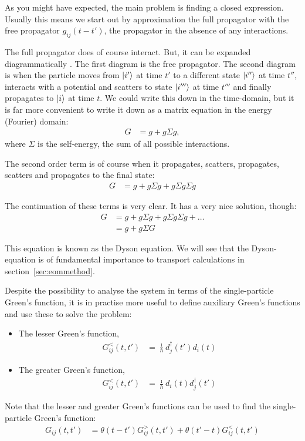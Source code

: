As you might have expected, the main problem is finding a closed expression. Usually this means we start out by approximation the full propagator with the free propagator $g_{ij}(t-t')$, the propagator in the absence of any interactions. 

The full propagator does of course interact. But, it can be expanded diagrammatically \cite{mattuck}. The first diagram is the free propagator. The second diagram is when the particle moves from $\ket{i'}$ at time $t'$ to a different state $\ket{i''}$ at time $t''$, interacts with a potential and scatters to state $\ket{i'''}$ at time $t'''$ and finally propagates to $\ket{i}$ at time $t$. We could write this down in the time-domain, but it is far more convenient to write it down as a matrix equation in the energy (Fourier) domain:
\begin{align*}
G &= g + g \Sigma g,
\end{align*}
where $\Sigma$ is the self-energy, the sum of all possible interactions.

The second order term is of course when it propagates, scatters, propagates, scatters and propagates to the final state:
\begin{align*}
G &= g + g \Sigma g + g \Sigma g \Sigma g
\end{align*}

The continuation of these terms is very clear. It has a very nice solution, though:
\begin{align}
G &= g + g \Sigma g + g \Sigma g \Sigma g+ \ldots \nonumber\\
&= g + g \Sigma G \label{eq:dyson}
\end{align}

This equation is known as the Dyson equation. We will see that the Dyson-equation is of fundamental importance to transport calculations in section~\ref{sec:eommethod}.

Despite the possibility to analyse the system in terms of the single-particle Green's function, it is in practise more useful to define auxiliary Green's functions and use these to solve the problem:
\begin{itemize}
\item The lesser Green's function, 
\begin{align*}
G^<_{ij}(t,t') &= \frac{\imath}{\hbar}d^\dagger_j(t')d_i(t)
\end{align*}
\item The greater Green's function, 
\begin{align*}
G^<_{ij}(t,t') &= \frac{\imath}{\hbar}d_i(t)d^\dagger_j(t')
\end{align*}
\end{itemize}
Note that the lesser and greater Green's functions can be used to find the single-particle Green's function:
\begin{align*}
G_{ij}(t,t') &= \theta(t-t')G^>_{ij} (t,t') + \theta(t'-t) G_{ij}^<(t,t')
\end{align*}

